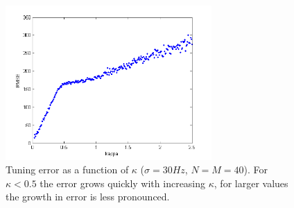 \documentclass{scrartcl}
\begin{document}
\begin{figure}
\centering
\includegraphics[trim = {0.7cm 0 0.5cm 0.2cm}, width = 0.7\textwidth, clip]{../pics/kappa}
\caption{Tuning error as a function of $\kappa$ ($\sigma=30\si{Hz}$, $N=M=40$). For $\kappa < 0.5$ the error grows quickly with increasing $\kappa$, for larger values the growth in error is less pronounced.}
\end{figure}
\end{document}
